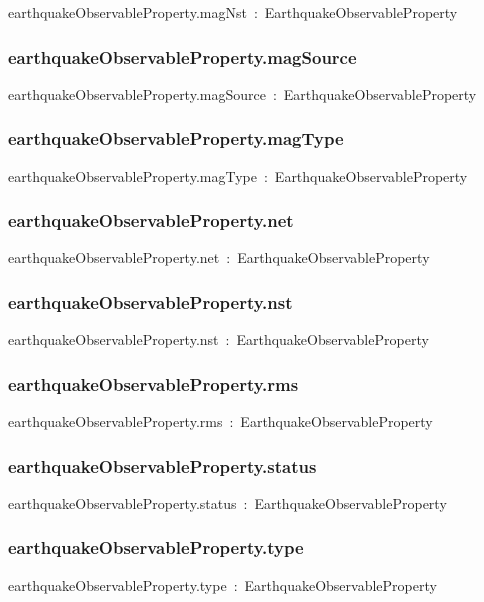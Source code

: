 \documentclass{article}
\begin{document}
earthquakeObservableProperty.magNst~:~EarthquakeObservableProperty

\subsubsection*{earthquakeObservableProperty.magSource}

earthquakeObservableProperty.magSource~:~EarthquakeObservableProperty

\subsubsection*{earthquakeObservableProperty.magType}

earthquakeObservableProperty.magType~:~EarthquakeObservableProperty

\subsubsection*{earthquakeObservableProperty.net}

earthquakeObservableProperty.net~:~EarthquakeObservableProperty

\subsubsection*{earthquakeObservableProperty.nst}

earthquakeObservableProperty.nst~:~EarthquakeObservableProperty

\subsubsection*{earthquakeObservableProperty.rms}

earthquakeObservableProperty.rms~:~EarthquakeObservableProperty

\subsubsection*{earthquakeObservableProperty.status}

earthquakeObservableProperty.status~:~EarthquakeObservableProperty

\subsubsection*{earthquakeObservableProperty.type}

earthquakeObservableProperty.type~:~EarthquakeObservableProperty
\end{document}
